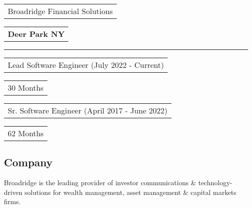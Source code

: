 \documentclass[letterpaper,9pt]{article}
\begin{document}
    \noindent
    \begin{tabular}[t]{@{}l}
    \Large{Broadridge Financial Solutions}
    \end{tabular}
    \hfill
    \begin{tabular}[t]{l@{}}
    \textbf{\color{black}Deer Park NY}
    \end{tabular}
    \noindent\rule{\textwidth}{0.5pt}
    \begin{tabular}[t]{@{}l}
    Lead Software Engineer (July 2022 - Current)
    \end{tabular}
    \hfill
    \begin{tabular}[t]{l@{}}
    30 Months
    \end{tabular}
    \begin{tabular}[t]{@{}l}
    Sr. Software Engineer (April 2017 - June 2022)
    \end{tabular}
    \hfill
    \begin{tabular}[t]{l@{}}
    62 Months
    \end{tabular}

    \subsection{Company}
    Broadridge is the leading provider of investor communications \& technology-driven solutions for wealth management, asset management \& capital markets firms.
\end{document}
